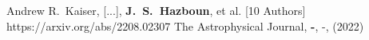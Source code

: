          {Andrew R.~{Kaiser}, [...], \textbf{J.~S.~{Hazboun}}, et al. [10 Authors]}
         {https://arxiv.org/abs/2208.02307}
         {{The Astrophysical Journal}, \textbf{-}, -, (2022)}

